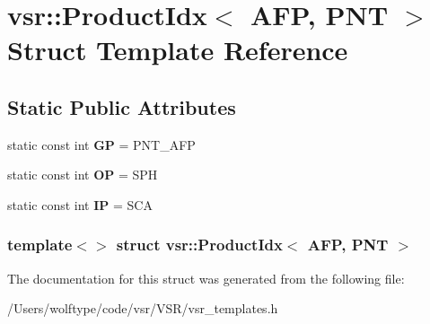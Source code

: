 \hypertarget{structvsr_1_1_product_idx_3_01_a_f_p_00_01_p_n_t_01_4}{\section{vsr\-:\-:Product\-Idx$<$ A\-F\-P, P\-N\-T $>$ Struct Template Reference}
\label{structvsr_1_1_product_idx_3_01_a_f_p_00_01_p_n_t_01_4}
}
\subsection*{Static Public Attributes}
\begin{DoxyCompactItemize}
\item 
\hypertarget{structvsr_1_1_product_idx_3_01_a_f_p_00_01_p_n_t_01_4_ad0b8d54bcfbedf6ad414990b65c5ab81}{static const int {\bfseries G\-P} = P\-N\-T\-\_\-\-A\-F\-P}\label{structvsr_1_1_product_idx_3_01_a_f_p_00_01_p_n_t_01_4_ad0b8d54bcfbedf6ad414990b65c5ab81}

\item 
\hypertarget{structvsr_1_1_product_idx_3_01_a_f_p_00_01_p_n_t_01_4_a346ef79396e938d0457fe2650e0851af}{static const int {\bfseries O\-P} = S\-P\-H}\label{structvsr_1_1_product_idx_3_01_a_f_p_00_01_p_n_t_01_4_a346ef79396e938d0457fe2650e0851af}

\item 
\hypertarget{structvsr_1_1_product_idx_3_01_a_f_p_00_01_p_n_t_01_4_a6fe65a9e22753b23e7bff37537e0ffa1}{static const int {\bfseries I\-P} = S\-C\-A}\label{structvsr_1_1_product_idx_3_01_a_f_p_00_01_p_n_t_01_4_a6fe65a9e22753b23e7bff37537e0ffa1}

\end{DoxyCompactItemize}
\subsubsection*{template$<$$>$ struct vsr\-::\-Product\-Idx$<$ A\-F\-P, P\-N\-T $>$}



The documentation for this struct was generated from the following file\-:\begin{DoxyCompactItemize}
\item 
/\-Users/wolftype/code/vsr/\-V\-S\-R/vsr\-\_\-templates.\-h\end{DoxyCompactItemize}
